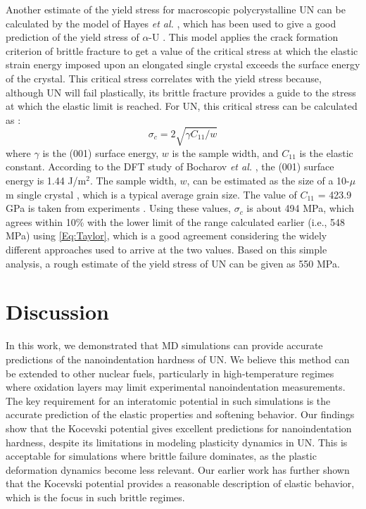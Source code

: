 \documentclass[applsci,article,submit,pdftex,moreauthors]{Definitions/mdpi}
\newcommand{\?}{\stackrel{?}{=}}
\begin{document}
Another estimate of the yield stress for macroscopic polycrystalline UN can be calculated by the model of Hayes \textit{et al.} \cite{Hayes2004}, which has been used to give a good prediction of the yield stress of $\alpha$-U \cite{Taylor2008}. This model applies the crack formation criterion of brittle fracture \cite{Murty2013} to get a value of the critical stress at which the elastic strain energy imposed upon an elongated single crystal exceeds the surface energy of the crystal. This critical stress correlates with the yield stress because, although UN will fail plastically, its brittle fracture provides a guide to the stress at which the elastic limit is reached. For UN, this critical stress can be calculated as \cite{Hayes2004, Taylor2008}:
\begin{equation}
\sigma_c = 2 \sqrt{\gamma C_{11} / w} 
\end{equation}
where $\gamma$ is the (001) surface energy, $w$ is the sample width, and $C_{11}$ is the elastic constant. According to the DFT study of Bocharov \textit{et al.} \cite{Bocharov2013}, the (001) surface energy is 1.44 J/m$^2$. The sample width, $w$, can be estimated as the size of a 10-$\mu$m single crystal \cite{Hayes2004, Taylor2008}, which is a typical average grain size. The value of $C_{11}$ = 423.9 GPa is taken from experiments \cite{Salleh1986}. Using these values, $\sigma_c$ is about 494 MPa, which agrees within 10\% with the lower limit of the range calculated earlier (i.e., 548 MPa) using \cref{Eq:Taylor}, which is a good agreement considering the widely different approaches used to arrive at the two values. Based on this simple analysis, a rough estimate of the yield stress of UN can be given as 550 MPa.

\section{Discussion}

In this work, we demonstrated that MD simulations can provide accurate predictions of the nanoindentation hardness of UN. We believe this method can be extended to other nuclear fuels, particularly in high-temperature regimes where oxidation layers may limit experimental nanoindentation measurements. The key requirement for an interatomic potential in such simulations is the accurate prediction of the elastic properties and softening behavior. Our findings show that the Kocevski potential gives excellent predictions for nanoindentation hardness, despite its limitations in modeling plasticity dynamics in UN. This is acceptable for simulations where brittle failure dominates, as the plastic deformation dynamics become less relevant. Our earlier work \cite{AbdulHameed2024} has further shown that the Kocevski potential provides a reasonable description of elastic behavior, which is the focus in such brittle regimes.
\end{document}
